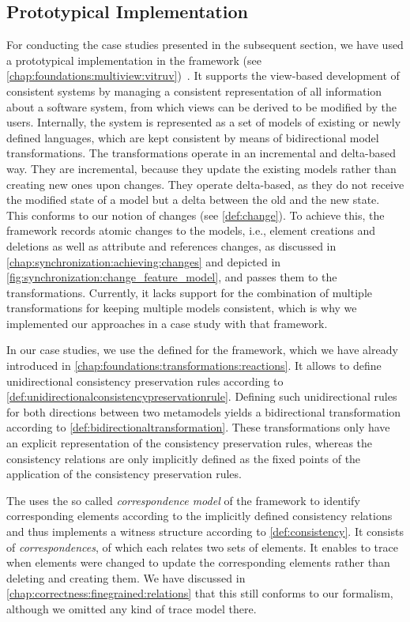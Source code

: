 \subsection{Prototypical Implementation}

For conducting the case studies presented in the subsequent section, we have used a prototypical implementation in the \vitruv framework (see \autoref{chap:foundations:multiview:vitruv})~.
It supports the view-based development of consistent systems by managing a consistent representation of all information about a software system, from which views can be derived to be modified by the users.
Internally, the system is represented as a set of models of existing or newly defined languages, which are kept consistent by means of bidirectional model transformations.
The transformations operate in an incremental and delta-based way.
They are incremental, because they update the existing models rather than creating new ones upon changes.
They operate delta-based, as they do not receive the modified state of a model but a delta between the old and the new state.
This conforms to our notion of changes (see \autoref{def:change}).
To achieve this, the framework records atomic changes to the models, i.e., element creations and deletions as well as attribute and references changes, as discussed in \autoref{chap:synchronization:achieving:changes} and depicted in \autoref{fig:synchronization:change_feature_model}, and passes them to the transformations.
Currently, it lacks support for the combination of multiple transformations for keeping multiple models consistent, which is why we implemented our approaches in a case study with that framework.

In our case studies, we use the \reactionslanguage defined for the \vitruv framework, which we have already introduced in \autoref{chap:foundations:transformations:reactions}.
It allows to define unidirectional consistency preservation rules according to \autoref{def:unidirectionalconsistencypreservationrule}.
Defining such unidirectional rules for both directions between two metamodels yields a bidirectional transformation according to \autoref{def:bidirectionaltransformation}.
These transformations only have an explicit representation of the consistency preservation rules, whereas the consistency relations are only implicitly defined as the fixed points of the application of the consistency preservation rules.

The \reactionslanguage uses the so called \emph{correspondence model} of the \vitruv framework to identify corresponding elements according to the implicitly defined consistency relations and thus implements a witness structure according to \autoref{def:consistency}.
It consists of \emph{correspondences}, of which each relates two sets of elements.
It enables to trace when elements were changed to update the corresponding elements rather than deleting and creating them.
We have discussed in \autoref{chap:correctness:finegrained:relations} that this still conforms to our formalism, although we omitted any kind of trace model there.

